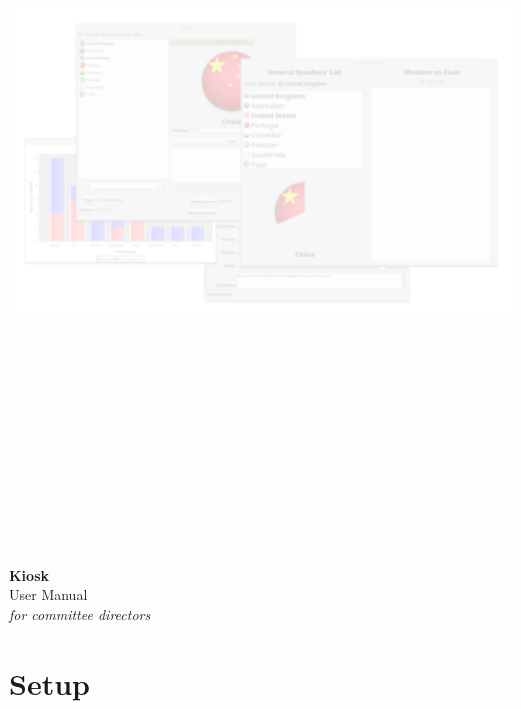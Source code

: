 \documentclass{article}
\begin{document}
\begin{titlepage}
  \vspace*{-1in}
  \centerline{\includegraphics[height=8in]{img/hero_transparent.png}}
  \vspace*{-8in}
  \vspace{3in}
  \centering
  {\Huge \bfseries Kiosk} \\[24pt]
  {\Large User Manual \\[12pt] \itshape for committee directors}
\end{titlepage}

\tableofcontents

\section{Setup}
\end{document}
